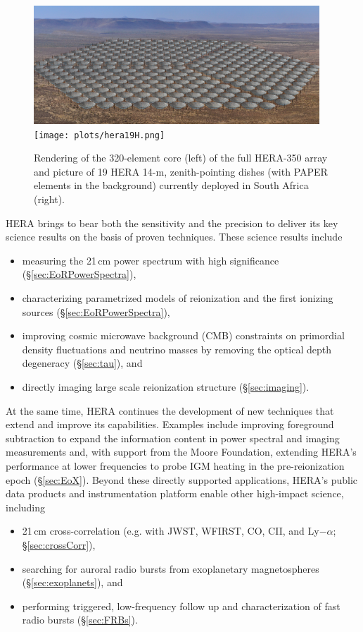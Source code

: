 \documentclass[preprint,11pt]{aastex}
\begin{document}
\begin{figure}[h!]
	\centering
	\includegraphics[height=1.75in]{plots/hera_render.png}
	\texttt{[image: plots/hera19H.png]}
	\caption{Rendering of the 320-element core (left) of the full HERA-350 array and picture of 19 HERA 14-m, zenith-pointing dishes (with PAPER elements in the background) currently deployed in South Africa (right).} 
	\label{fig:HERApictures}
\end{figure}

HERA brings to bear both the sensitivity and the precision to deliver 
its key science results on the basis of proven techniques.
These science results include
\begin{itemize}[noitemsep,nolistsep]
\item measuring the 21\,cm power spectrum with high significance (\S\ref{sec:EoRPowerSpectra}),
\item characterizing parametrized models of reionization and the first ionizing sources (\S\ref{sec:EoRPowerSpectra}),
\item improving cosmic microwave background (CMB) constraints on primordial density fluctuations and neutrino masses by removing the optical depth degeneracy (\S\ref{sec:tau}), and
\item directly imaging large scale reionization structure (\S\ref{sec:imaging}).
\end{itemize}
At the same time, HERA continues the development of new techniques that extend and improve its capabilities.
Examples include improving foreground subtraction to expand the information content 
in power spectral and imaging measurements and, with support from the Moore Foundation,
extending HERA's performance at lower frequencies to probe IGM heating in the pre-reionization epoch (\S\ref{sec:EoX}).
Beyond these directly supported applications, HERA's public data products and instrumentation platform enable other high-impact science, including 
\begin{itemize}[noitemsep,nolistsep]
\item 21\,cm cross-correlation (e.g. with JWST, WFIRST, CO, CII, and Ly$-\alpha$; \S\ref{sec:crossCorr}),
\item searching for auroral radio bursts from exoplanetary magnetospheres (\S\ref{sec:exoplanets}), and
\item performing triggered, low-frequency follow up and characterization of fast radio bursts (\S\ref{sec:FRBs}).
\end{itemize}
\end{document}
